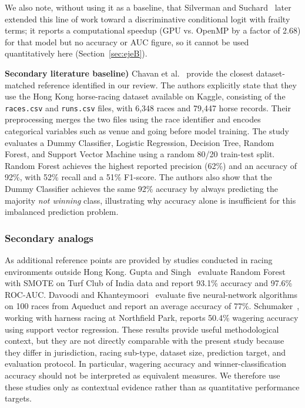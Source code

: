 We also note, without using it as a baseline, that Silverman and
Suchard~\cite{ejeA_gupta2023} later extended this line of work toward a
discriminative conditional logit with frailty terms; it reports a computational
speedup (GPU vs. OpenMP by a factor of 2.68) for that model but no accuracy or AUC
figure, so it cannot be used quantitatively here (Section~\ref{sec:ejeB}).

\textbf{Secondary literature baseline)}
Chavan et al.~\cite{ejeC_chavan2024} provide the closest dataset-matched
reference identified in our review. The authors explicitly state that they use
the Hong Kong horse-racing dataset available on Kaggle, consisting of the
\texttt{races.csv} and \texttt{runs.csv} files, with 6,348 races and 79,447
horse records. Their preprocessing merges the two files using the race
identifier and encodes categorical variables such as venue and going before
model training. The study evaluates a Dummy Classifier, Logistic Regression,
Decision Tree, Random Forest, and Support Vector Machine using a random
80/20 train-test split. Random Forest achieves the highest reported precision
(62\%) and an accuracy of 92\%, with 52\% recall and a 51\% F1-score. The
authors also show that the Dummy Classifier achieves the same 92\% accuracy by
always predicting the majority \textit{not winning} class, illustrating why
accuracy alone is insufficient for this imbalanced prediction problem.

\subsubsection*{\textbf{Secondary analogs}} As additional reference
points are provided by studies conducted in racing environments outside Hong
Kong. Gupta and Singh~\cite{ejeA_gupta2023} evaluate Random Forest with SMOTE
on Turf Club of India data and report 93.1\% accuracy and 97.6\% ROC-AUC.
Davoodi and Khanteymoori~\cite{ejeA_davoodi2010} evaluate five neural-network
algorithms on 100 races from Aqueduct and report an average accuracy of 77\%.
Schumaker~\cite{ejeA_schumaker2018}, working with harness racing at Northfield
Park, reports 50.4\% wagering accuracy using support vector regression. These
results provide useful methodological context, but they are not directly
comparable with the present study because they differ in jurisdiction, racing
sub-type, dataset size, prediction target, and evaluation protocol. In
particular, wagering accuracy and winner-classification accuracy should not be
interpreted as equivalent measures. We therefore use these studies only as
contextual evidence rather than as quantitative performance targets.